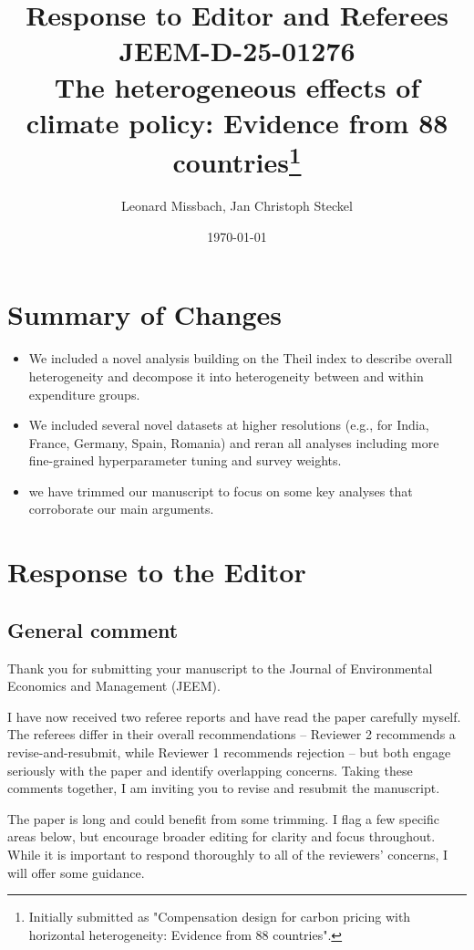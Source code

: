 \documentclass[11pt]{article}
\title{Response to Editor and Referees\\
\textbf{JEEM-D-25-01276} \\ 
The heterogeneous effects of climate policy: Evidence from 88 countries\footnote{Initially submitted as "Compensation design for carbon pricing with horizontal heterogeneity: Evidence from 88 countries".}
}
\author{Leonard Missbach, Jan Christoph Steckel}
\date{\today}
\begin{document}
\maketitle

\section*{Summary of Changes}

\begin{itemize}
\item We included a novel analysis building on the Theil index to describe overall heterogeneity and decompose it into heterogeneity between and within expenditure groups.
\item We included several novel datasets at higher resolutions (e.g., for India, France, Germany, Spain, Romania) and reran all analyses including more fine-grained hyperparameter tuning and survey weights.
\item we have trimmed our manuscript to focus on some key analyses that corroborate our main arguments.
\end{itemize}

\newpage


\section*{Response to the Editor}

\subsection*{General comment}\label{comment_E_0}

\begin{commentbox}
    Thank you for submitting your manuscript to the Journal of Environmental Economics and Management (JEEM).

    I have now received two referee reports and have read the paper carefully myself. The referees differ in their overall recommendations -- Reviewer 2 recommends a revise-and-resubmit, while Reviewer 1 recommends rejection -- but both engage seriously with the paper and identify overlapping concerns. Taking these comments together, I am inviting you to revise and resubmit the manuscript.

    The paper is long and could benefit from some trimming.  I flag a few specific areas below, but encourage broader editing for clarity and focus throughout. While it is important to respond thoroughly to all of the reviewers’ concerns, I will offer some guidance. 
\end{commentbox}
\end{document}
